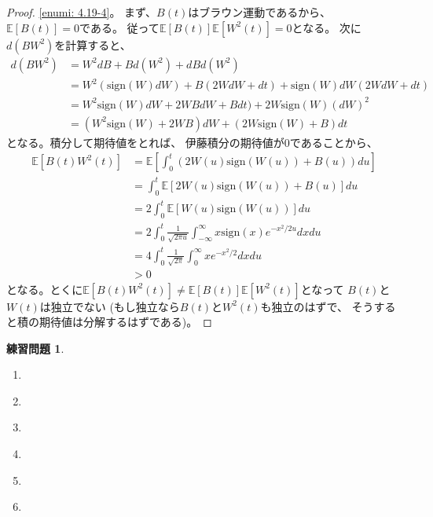 \documentclass[uplatex]{jsarticle}
\theoremstyle{definition}
\newtheorem{prob}[prob]{練習問題}
\def\E{\mathbb{E}}
\begin{document}
\begin{proof}
  \ref{enumi: 4.19-4}。
  まず、\(B(t)\)はブラウン運動であるから、\(\E[B(t)] = 0\)である。
  従って\(\E [B(t)] \E[W^2(t)] = 0\)となる。
  次に\(d(BW^2)\)を計算すると、
  \begin{align*}
    d(BW^2)
    &= W^2dB + Bd(W^2) + dBd(W^2) \\
    &= W^2(\mathrm{sign}(W)dW) + B(2WdW + dt)
    + \mathrm{sign}(W)dW(2WdW + dt)\\
    &= W^2\mathrm{sign}(W)dW + 2WBdW + Bdt)
    + 2W\mathrm{sign}(W)(dW)^2\\
    &= (W^2\mathrm{sign}(W) + 2WB)dW
    + (2W\mathrm{sign}(W) + B)dt
  \end{align*}
  となる。積分して期待値をとれば、
  伊藤積分の期待値が\(0\)であることから、
  \begin{align*}
    \E[B(t)W^2(t)]
    &= \E \left[ \int_0^t (2W(u)\mathrm{sign}(W(u)) + B(u))du \right] \\
    &= \int_0^t \E \left[2W(u)\mathrm{sign}(W(u)) + B(u) \right] du \\
    &= 2 \int_0^t \E \left[ W(u)\mathrm{sign}(W(u))\right] du \\
    &= 2 \int_0^t \frac{1}{\sqrt{2\pi u}}\int_{-\infty}^\infty
    x\mathrm{sign}(x)e^{-x^2/2u}dxdu \\
    &= 4 \int_0^t \frac{1}{\sqrt{2\pi}}\int_0^\infty
    xe^{-x^2/2}dxdu \\
    &>0
  \end{align*}
  となる。とくに\(\E[B(t)W^2(t)] \neq \E [B(t)] \E[W^2(t)]\)となって
  \(B(t)\)と\(W(t)\)は独立でない
  (もし独立なら\(B(t)\)と\(W^2(t)\)も独立のはずで、
  そうすると積の期待値は分解するはずである)。
\end{proof}



\begin{prob}\label{prob: 4.20}
  \begin{enumerate}
    \item \label{enumi: 4.20-1}
    \item \label{enumi: 4.20-2}
    \item \label{enumi: 4.20-3}
    \item \label{enumi: 4.20-4}
    \item \label{enumi: 4.20-5}
    \item \label{enumi: 4.20-6}
  \end{enumerate}
\end{prob}
\end{document}
